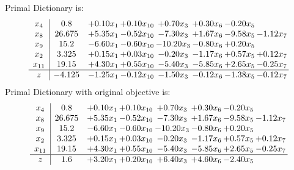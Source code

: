 \documentclass[9pt]{article}
\begin{document}
Primal Dictionary is:
\[\begin{array}{c| c c@{\hskip 2pt} c@{\hskip 2pt} c@{\hskip 2pt} c@{\hskip 2pt} c@{\hskip 2pt} c@{\hskip 2pt} }
 x_{4}   &  0.8 & +  0.10 x_{1} & +  0.10 x_{10} & +  0.70 x_{3} & +  0.30 x_{6} & -0.20 x_{5} &   \\
 x_{8}   &  26.675 & +  5.35 x_{1} & -0.52 x_{10} & -7.30 x_{3} & +  1.67 x_{6} & -9.58 x_{5} & -1.12 x_{7}\\
 x_{9}   &  15.2 & -6.60 x_{1} & -0.60 x_{10} & -10.20 x_{3} & -0.80 x_{6} & +  0.20 x_{5} &   \\
 x_{2}   &  3.325 & +  0.15 x_{1} & +  0.03 x_{10} & -0.20 x_{3} & -1.17 x_{6} & +  0.57 x_{5} & +  0.12 x_{7}\\
 x_{11}   &  19.15 & +  4.30 x_{1} & +  0.55 x_{10} & -5.40 x_{3} & -5.85 x_{6} & +  2.65 x_{5} & -0.25 x_{7}\\
\hline
z    &  -4.125 & -1.25 x_{1} & -0.12 x_{10} & -1.50 x_{3} & -0.12 x_{6} & -1.38 x_{5} & -0.12 x_{7}\\
\end{array}\]
Primal Dictionary with original objective is:
\[\begin{array}{c| c c@{\hskip 2pt} c@{\hskip 2pt} c@{\hskip 2pt} c@{\hskip 2pt} c@{\hskip 2pt} c@{\hskip 2pt} }
 x_{4}   &  0.8 & +  0.10 x_{1} & +  0.10 x_{10} & +  0.70 x_{3} & +  0.30 x_{6} & -0.20 x_{5} &   \\
 x_{8}   &  26.675 & +  5.35 x_{1} & -0.52 x_{10} & -7.30 x_{3} & +  1.67 x_{6} & -9.58 x_{5} & -1.12 x_{7}\\
 x_{9}   &  15.2 & -6.60 x_{1} & -0.60 x_{10} & -10.20 x_{3} & -0.80 x_{6} & +  0.20 x_{5} &   \\
 x_{2}   &  3.325 & +  0.15 x_{1} & +  0.03 x_{10} & -0.20 x_{3} & -1.17 x_{6} & +  0.57 x_{5} & +  0.12 x_{7}\\
 x_{11}   &  19.15 & +  4.30 x_{1} & +  0.55 x_{10} & -5.40 x_{3} & -5.85 x_{6} & +  2.65 x_{5} & -0.25 x_{7}\\
\hline
z    &  1.6 & +  3.20 x_{1} & +  0.20 x_{10} & +  6.40 x_{3} & +  4.60 x_{6} & -2.40 x_{5} &   \\
\end{array}\]
\end{document}
